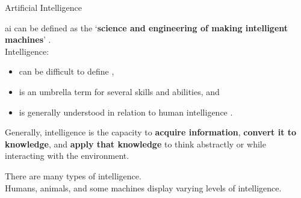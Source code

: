 \begin{frame}{Artificial Intelligence}

    \gls{ai} 
    can be defined as the 
    `{\bf science and engineering of making intelligent 
    machines}' \cite{McCarthy:2007ai}.\\
    \vspace{0.2cm}
    Intelligence: 
    \begin{itemize}
        \item can be difficult to define \cite{Neisser:1996intl},
        \item is an umbrella term for several skills and abilities, and
        \item is generally understood in relation to human intelligence \cite{McCarthy:2007ai}.\\
    \end{itemize}
    \vspace{0.1cm}
    \begin{block}{}
    Generally, intelligence is the capacity to {\bf acquire information}, 
    {\bf convert it to knowledge}, and {\bf apply that knowledge} 
    to think abstractly or while interacting with the environment.\\
    \end{block}
    \vspace{0.1cm}
    There are many types of intelligence.\\
    \vspace{0.1cm}
    Humans, animals, and some machines display varying levels of intelligence.\\
    
\end{frame}
    